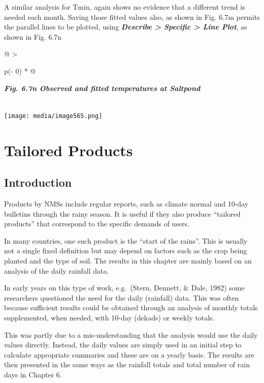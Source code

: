 \documentclass[
  letterpaper,
  DIV=11,
  numbers=noendperiod]{scrreprt}
\begin{document}
A similar analysis for Tmin, again shows no evidence that a different
trend is needed each month. Saving those fitted values also, as shown in
Fig. 6.7m permits the parallel lines to be plotted, using
\textbf{\emph{Describe \textgreater{} Specific \textgreater{} Line
Plot}}, as shown in Fig. 6.7n

\begin{longtable}[]{@{}
  >{\raggedright\arraybackslash}p{(\columnwidth - 0\tabcolsep) * }@{}}
\toprule\noalign{}
\begin{minipage}[b]{\linewidth}\raggedright
\textbf{\emph{Fig. 6.7n Observed and fitted temperatures at Saltpond}}
\end{minipage} \\
\midrule\noalign{}
\endhead
\bottomrule\noalign{}
\endlastfoot
\texttt{[image: media/image565.png]} \\
\end{longtable}


\chapter{Tailored Products}\label{tailored-products}

\section{Introduction}\label{introduction-5}

Products by NMSs include regular reports, such as climate normal and
10-day bulletins through the rainy season. It is useful if they also
produce ``tailored products'' that correspond to the specific demands of
users.

In many countries, one such product is the ``start of the rains''. This
is usually not a single fixed definition but may depend on factors such
as the crop being planted and the type of soil. The results in this
chapter are mainly based on an analysis of the daily rainfall data.

In early years on this type of work, e.g.~(Stern, Dennett, \& Dale,
1982) some researchers questioned the need for the daily (rainfall)
data. This was often because sufficient results could be obtained
through an analysis of monthly totals supplemented, when needed, with
10-day (dekads) or weekly totals.

This was partly due to a mis-understanding that the analysis would use
the daily values directly. Instead, the daily values are simply used in
an initial step to calculate appropriate summaries and these are on a
yearly basis. The results are then presented in the same ways as the
rainfall totals and total number of rain days in Chapter 6.
\end{document}
